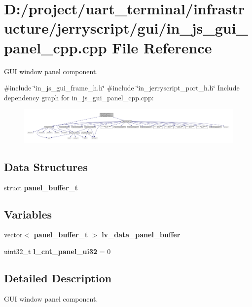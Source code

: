 \section{D\+:/project/uart\+\_\+terminal/infrastructure/jerryscript/gui/in\+\_\+js\+\_\+gui\+\_\+panel\+\_\+cpp.cpp File Reference}
\label{in__js__gui__panel__cpp_8cpp}


G\+UI window panel component.  


{\ttfamily \#include \char`\"{}in\+\_\+js\+\_\+gui\+\_\+frame\+\_\+h.\+h\char`\"{}}\newline
{\ttfamily \#include \char`\"{}in\+\_\+jerryscript\+\_\+port\+\_\+h.\+h\char`\"{}}\newline
Include dependency graph for in\+\_\+js\+\_\+gui\+\_\+panel\+\_\+cpp.\+cpp\+:\nopagebreak
\begin{figure}[H]
\begin{center}
\leavevmode
\includegraphics[width=350pt]{in__js__gui__panel__cpp_8cpp__incl}
\end{center}
\end{figure}
\subsection*{Data Structures}
\begin{DoxyCompactItemize}
\item 
struct \textbf{ panel\+\_\+buffer\+\_\+t}
\end{DoxyCompactItemize}
\subsection*{Variables}
\begin{DoxyCompactItemize}
\item 
vector$<$ \textbf{ panel\+\_\+buffer\+\_\+t} $>$ \textbf{ lv\+\_\+data\+\_\+panel\+\_\+buffer}
\item 
uint32\+\_\+t {\bfseries l\+\_\+cnt\+\_\+panel\+\_\+ui32} = 0
\end{DoxyCompactItemize}


\subsection{Detailed Description}
G\+UI window panel component. 

